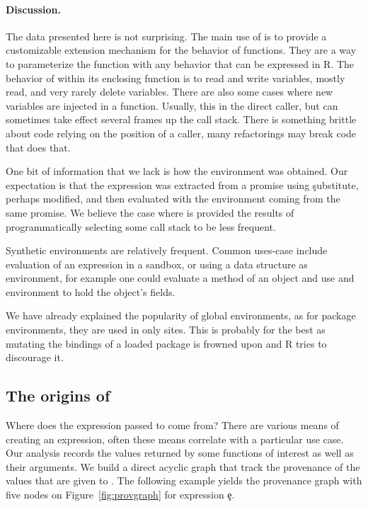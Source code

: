 \documentclass[screen,acmsmall]{acmart}%
\begin{document}
\paragraph{Discussion.}
The data presented here is not surprising. The main use of \eval is to provide a
customizable extension mechanism for the behavior of functions. They are a way
to parameterize the function with any behavior that can be expressed in R. The
behavior of \eval within its enclosing function is to read and write variables,
mostly read, and very rarely delete variables. There are also some cases where
new variables are injected in a function. Usually, this in the direct caller,
but can sometimes take effect several frames up the call stack. There is
something brittle about code relying on the position of a caller, many
refactorings may break code that does that.

One bit of information that we lack is how the environment was obtained. Our
expectation is that the expression was extracted from a promise using
\c{substitute}, perhaps modified, and then evaluated with the environment coming
from the same promise. We believe the case where \eval is provided the results
of programmatically selecting some call stack to be less frequent.

Synthetic environments are relatively frequent. Common uses-case include
evaluation of an expression in a sandbox, or using a data structure as
environment, for example one could evaluate a method of an object and use and
environment to hold the object's fields.

We have already explained the popularity of global environments, as for package
environments, they are used in only \packageNbPackageNamespaceEnvSites sites.
This is probably for the best as mutating the bindings of a loaded package is
frowned upon and R tries to discourage it.

\subsection{The origins of \eval}

Where does the expression passed to \eval come from? There are various means of
creating an expression, often these means correlate with a particular use case.
Our analysis records the values returned by some functions of interest as well
as their arguments. We build a direct acyclic graph that track the provenance of
the values that are given to \eval. The following example yields the provenance
graph with five nodes on Figure~\ref{fig:provgraph} for expression \c{e}.
\end{document}
